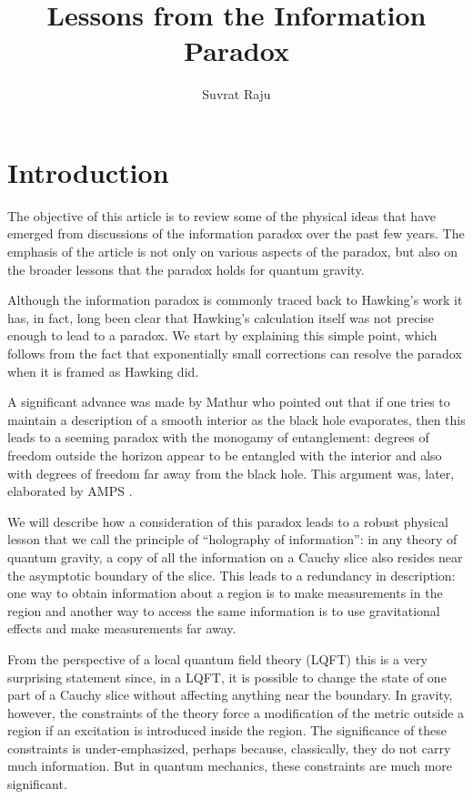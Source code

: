 \documentclass[12pt]{article}
\title{Lessons from the Information Paradox}
\author{Suvrat Raju}
\affiliation{International Centre for Theoretical Sciences, Tata Institute of Fundamental Research, Shivakote, Bengaluru 560089, India.}
\date{}
\begin{document}
\maketitle
\section{Introduction}
The objective of this article is to review some of the physical ideas that have emerged from discussions of the information paradox over the past few years. The emphasis of the article is not only on various aspects of the
paradox, but also on the broader lessons that the paradox holds for quantum gravity.

Although the information paradox is commonly traced back to Hawking's work \cite{Hawking:1976ra,Hawking:1974sw}  it has, in fact, long been clear that Hawking's calculation itself was not precise enough to lead to a paradox. We start by explaining this simple point, which follows from the fact that  exponentially small corrections can resolve the paradox when it is framed as Hawking did.

A significant advance was made by Mathur \cite{Mathur:2009hf} who pointed out that if one tries to maintain a description of a smooth interior as the black hole evaporates, then this leads to a seeming paradox with the monogamy of entanglement: degrees of freedom outside the horizon appear to be entangled with the interior and also with degrees of freedom far away from the black hole. This argument was, later, elaborated by AMPS  \cite{Almheiri:2012rt}.



We will describe how a consideration of this paradox leads to a robust physical lesson that we call the principle of ``holography of information'': in any theory of quantum gravity, a copy of all the information on a Cauchy slice also resides near the asymptotic boundary of the slice. This leads to a redundancy in description: one way to obtain information about a region is to make measurements in the region and another way to access the same information is to use gravitational effects and make measurements far away. 




From the perspective of a local quantum field theory (LQFT) this is a very surprising statement since, in a LQFT, it is possible to change the state of one part of a Cauchy slice without affecting anything near the boundary. In gravity, however, the constraints of the theory force a modification of the metric outside a region if an excitation is introduced inside the region. The significance of these constraints is under-emphasized, perhaps because, classically, they do not carry much information. But in quantum mechanics, these constraints are much more significant.
\end{document}
